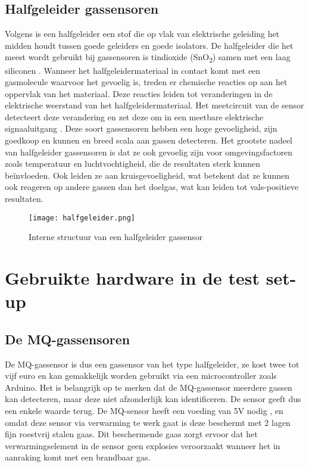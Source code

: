 \subsection{Halfgeleider gassensoren}
\label{subsec:MOS}

Volgens \textcite{wiki2022} is een halfgeleider een stof die op vlak van elektrische geleiding het midden houdt tussen goede geleiders en goede isolators. De halfgeleider die het meest wordt gebruikt bij gassensoren is tindioxide (SnO\textsubscript{2}) samen met een laag siliconen \autocite{Nikolic2020}. Wanneer het halfgeleidermateriaal in contact komt met een gasmolecule waarvoor het gevoelig is, treden er chemische reacties op aan het oppervlak van het materiaal. Deze reacties leiden tot veranderingen in de elektrische weerstand van het halfgeleidermateriaal. Het meetcircuit van de sensor detecteert deze verandering en zet deze om in een meetbare elektrische signaaluitgang \autocite{review2014}. Deze soort gassensoren hebben een hoge gevoeligheid, zijn goedkoop en kunnen en breed scala aan gassen detecteren. Het grootste nadeel van halfgeleider gassensoren is dat ze ook gevoelig zijn voor omgevingsfactoren zoals temperatuur en luchtvochtigheid, die de resultaten sterk kunnen beïnvloeden. Ook leiden ze aan kruisgevoeligheid, wat betekent dat ze kunnen ook reageren op andere gassen dan het doelgas, wat kan leiden tot vals-positieve resultaten.


\begin{figure}[h]
    \texttt{[image: halfgeleider.png]}
    \caption[Structuur halfgeleider gassensor]{Interne structuur van een halfgeleider gassensor \autocite{review2014}}
    \label{fig:halfgeleider}
\end{figure}

\pagebreak

\section{Gebruikte hardware in de test set-up}
\label{sec:hardware}


\subsection{De MQ-gassensoren}%
\label{subsec:werking-MQ}

De MQ-gassensor is dus een gassensor van het type halfgeleider, ze kost twee tot vijf euro en kan gemakkelijk worden gebruikt via een microcontroller zoals Arduino. Het is belangrijk op te merken dat de MQ-gassensor meerdere gassen kan detecteren, maar deze niet afzonderlijk kan identificeren. De sensor geeft dus een enkele waarde terug.
De MQ-sensor heeft een voeding van 5V nodig \autocite{akp2023}, en omdat deze sensor via verwarming te werk gaat is deze beschermt met 2 lagen fijn roestvrij stalen gaas. Dit beschermende gaas zorgt ervoor dat het verwarmingselement in de sensor geen explosies veroorzaakt wanneer het in aanraking komt met een brandbaar gas.


